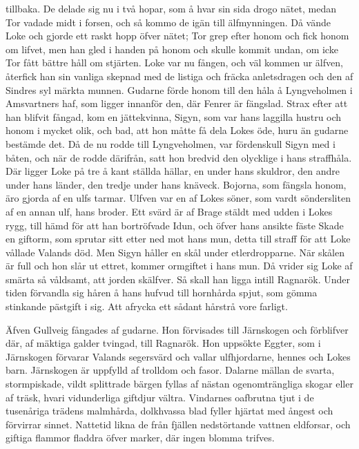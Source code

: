 tillbaka. De delade sig nu i två hopar, som å hvar sin sida drogo nätet,
medan Tor vadade midt i forsen, och så kommo de igän till älfmynningen.
Då vände Loke och gjorde ett raskt hopp öfver nätet; Tor grep efter
honom och fick honom om lifvet, men han gled i handen på honom och
skulle kommit undan, om icke Tor fått bättre håll om stjärten. Loke var
nu fången, och väl kommen ur älfven, återfick han sin vanliga skepnad
med de listiga och fräcka anletsdragen och den af Sindres syl märkta
munnen. Gudarne förde honom till den håla å Lyngveholmen i Amsvartners
haf, som ligger innanför den, där Fenrer är fängslad. Strax efter att
han blifvit fångad, kom en jättekvinna, Sigyn, som var hans laggilla
hustru och honom i mycket olik, och bad, att hon måtte få dela Lokes
öde, huru än gudarne bestämde det. Då de nu rodde till Lyngveholmen, var
fördenskull Sigyn med i båten, och när de rodde därifrån, satt hon
bredvid den olycklige i hans straffhåla. Där ligger Loke på tre å kant
ställda hällar, en under hans skuldror, den andre under hans länder, den
tredje under hans knäveck. Bojorna, som fängsla honom, äro gjorda af en
ulfs tarmar. Ulfven var en af Lokes söner, som vardt söndersliten af en
annan ulf, hans broder. Ett svärd är af Brage stäldt med udden i Lokes
rygg, till hämd för att han bortröfvade Idun, och öfver hans ansikte
fäste Skade en giftorm, som sprutar sitt etter ned mot hans mun, detta
till straff för att Loke vållade Valands död. Men Sigyn håller en skål
under etlerdropparne. När skålen är full och hon slår ut
\protect\hypertarget{lb1625905.xhtmlux5cux23start175}{}{}\protect\hypertarget{lb1625905.xhtmlux5cux23start175-a}{}{}\protect\hypertarget{lb1625905.xhtmlux5cux23start175-b}{}{}\protect\hypertarget{lb1625905.xhtmlux5cux23start175-c}{}{}\protect\hypertarget{lb1625905.xhtmlux5cux23start175-d}{}{}
ettret, kommer ormgiftet i hans mun. Då vrider sig Loke af smärta så
våldsamt, att jorden skälfver. Så skall han ligga intill Ragnarök. Under
tiden förvandla sig håren å hans hufvud till hornhårda spjut, som gömma
stinkande pästgift i sig. Att afrycka ett sådant hårstrå vore farligt.

Äfven Gullveig fångades af gudarne. Hon förvisades till Järnskogen och
förblifver där, af mäktiga galder tvingad, till Ragnarök. Hon uppsökte
Eggter, som i Järnskogen förvarar Valands segersvärd och vallar
ulfhjordarne, hennes och Lokes barn. Järnskogen är uppfylld af trolldom
och fasor. Dalarne mällan de svarta, stormpiskade, vildt splittrade
bärgen fyllas af nästan ogenomträngliga skogar eller af träsk, hvari
vidunderliga giftdjur vältra. Vindarnes oafbrutna tjut i de tusenåriga
trädens malmhårda, dolkhvassa blad fyller hjärtat med ångest och
förvirrar sinnet. Nattetid likna de från fjällen nedstörtande vattnen
eldforsar, och giftiga flammor fladdra öfver marker, där ingen blomma
trifves.

